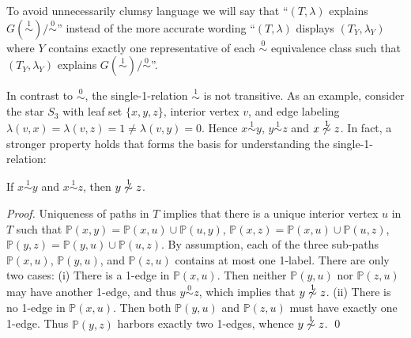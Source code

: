 \documentclass[smallextended]{svjour3}
\newcommand{\Ro}{\mathrel{\overset{0}{\sim}}}
\newcommand{\Rl}{\mathrel{\overset{1}{\sim}}}
\begin{document}
To avoid unnecessarily clumsy language we will say that ``$(T,\lambda)$
explains \hbox{$G(\Rl)/\Ro$}'' instead of the more accurate wording
``$(T,\lambda)$ displays $(T_Y,\lambda_Y)$ where $Y$ contains exactly one
representative of each $\Ro$ equivalence class such that $(T_Y,\lambda_Y)$
explains $G(\Rl)/\Ro$''.

In contrast to $\Ro$, the single-1-relation $\Rl$ is not transitive.  As an
example, consider the star $S_3$ with leaf set $\{x,y,z\}$, interior
vertex $v$, and edge labeling $\lambda(v,x)=\lambda(v,z)=1\neq
\lambda(v,y)=0$.  Hence $x\Rl y$, $y\Rl z$ and $x\not \Rl z$. In fact, a
stronger property holds that forms the basis for understanding the
single-1-relation:
\begin{lemma}
  If $x\Rl y$ and $x\Rl z$, then $y\not\Rl z$.
	\label{lem:not-trans}
\end{lemma}
\begin{proof}
  Uniqueness of paths in $T$ implies that there is a unique interior vertex
  $u$ in $T$ such that
  $\mathbb{P}(x,y)=\mathbb{P}(x,u)\cup\mathbb{P}(u,y)$,
  $\mathbb{P}(x,z)=\mathbb{P}(x,u)\cup\mathbb{P}(u,z)$,
  $\mathbb{P}(y,z)=\mathbb{P}(y,u)\cup\mathbb{P}(u,z)$.  By assumption,
  each of the three sub-paths $\mathbb{P}(x,u)$, $\mathbb{P}(y,u)$, and
  $\mathbb{P}(z,u)$ contains at most one 1-label. There are only two cases:
  (i) There is a 1-edge in $\mathbb{P}(x,u)$. Then neither
  $\mathbb{P}(y,u)$ nor $\mathbb{P}(z,u)$ may have another 1-edge, and thus
  $y\Ro z$, which implies that $y\not\Rl z$. (ii) There is no 1-edge in
  $\mathbb{P}(x,u)$. Then both $\mathbb{P}(y,u)$ and $\mathbb{P}(z,u)$ must
  have exactly one 1-edge. Thus $\mathbb{P}(y,z)$ harbors exactly two
  1-edges, whence $y\not\Rl z$. \qed \end{proof}
\end{document}
